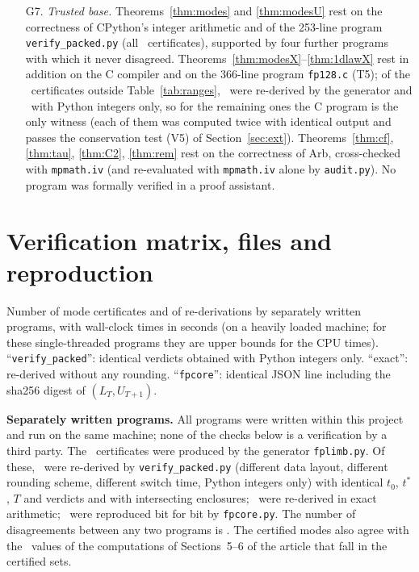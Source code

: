 \documentclass[11pt,a4paper]{article}
\theoremstyle{definition}
\theoremstyle{remark}
\begin{document}
\begin{itemize}
\item[G7.] \emph{Trusted base.} Theorems~\ref{thm:modes} and \ref{thm:modesU} rest on the correctness of CPython's integer arithmetic and of the 253-line program \texttt{verify\_packed.py} (all \TotalCerts\ certificates), supported by four further programs with which it never disagreed. Theorems~\ref{thm:modesX}--\ref{thm:1dlawX} rest in addition on the C compiler and on the 366-line program \texttt{fp128.c} (T5); of the \XTotalNew\ certificates outside Table~\ref{tab:ranges}, \XXLimb\ were re-derived by the generator and \XXPacked\ with Python integers only, so for the remaining ones the C program is the only witness (each of them was computed twice with identical output and passes the conservation test (V5) of Section~\ref{sec:ext}). Theorems~\ref{thm:cf}, \ref{thm:tau}, \ref{thm:C2}, \ref{thm:rem} rest on the correctness of Arb, cross-checked with \texttt{mpmath.iv} (and re-evaluated with \texttt{mpmath.iv} alone by \texttt{audit.py}). No program was formally verified in a proof assistant.
\end{itemize}

\section{Verification matrix, files and reproduction}\label{sec:verif}

\begin{table}[!htbp]\centering\small

\caption{Number of mode certificates and of re-derivations by separately written programs, with wall-clock times in seconds (on a heavily loaded machine; for these single-threaded programs they are upper bounds for the CPU times). ``\texttt{verify\_packed}'': identical verdicts obtained with Python integers only. ``exact'': re-derived without any rounding. ``\texttt{fpcore}'': identical JSON line including the sha256 digest of $(L_T,U_{T+1})$.}\label{tab:verif}
\end{table}

\textbf{Separately written programs.} All programs were written within this project and run on the same machine; none of the checks below is a verification by a third party. The \TotalCerts\ certificates were produced by the generator \texttt{fplimb.py}. Of these, \TotalPacked\ were re-derived by \texttt{verify\_packed.py} (different data layout, different rounding scheme, different switch time, Python integers only) with identical $t_0$, $t^*$, $T$ and verdicts and with intersecting enclosures; \TotalExact\ were re-derived in exact arithmetic; \TotalRef\ were reproduced bit for bit by \texttt{fpcore.py}. The number of disagreements between any two programs is \TotalMismatch. The certified modes also agree with the \FloatStudyAgree\ values of the computations of Sections~5--6 of the article that fall in the certified sets.
\end{document}

